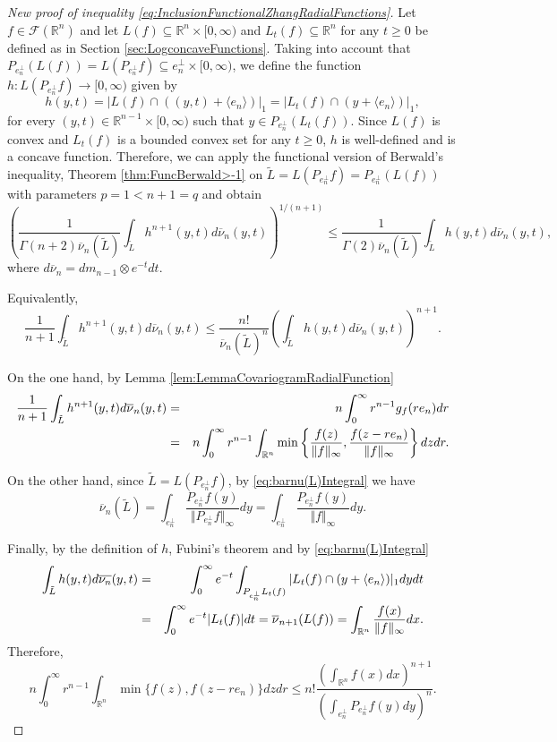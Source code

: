 \documentclass{amsart}
\newcommand{\R}{\mathbb R}
\theoremstyle{remark}
\theoremstyle{definition}
\numberwithin{equation}{section}
\begin{document}
\begin{proof}[New proof of inequality \eqref{eq:InclusionFunctionalZhangRadialFunctions}]
Let $f\in\mathcal{F}(\R^n)$ and let $L(f)\subseteq\R^n\times[0,\infty)$ and $L_t(f)\subseteq\R^n$ for any $t\geq0$ be defined as in Section \ref{sec:LogconcaveFunctions}. Taking into account that $P_{e_n^\perp}(L(f))=L(P_{e_n^\perp}f)\subseteq e_n^\perp\times[0,\infty)$, we define the function $h:L(P_{e_n^\perp}f)\to[0,\infty)$ given by
$$
h(y,t)=|L(f) \cap ((y,t)+\langle e_n \rangle )|_1=|L_t(f) \cap (y+\langle e_n \rangle)|_1,
$$
for every $(y,t)\in\R^{n-1}\times[0,\infty)$ such that $y\in P_{e_n^\perp}(L_t(f))$. Since $L(f)$ is convex and $L_t(f)$ is a bounded convex set for any $t\geq0$, $h$ is well-defined and is a concave function. Therefore, we can apply the functional version of Berwald's inequality, Theorem \ref{thm:FuncBerwald>-1} on $\tilde{L}=L(P_{e_n^\perp}f)=P_{e_n^\perp}(L(f))$ with parameters $p=1<n+1=q$ and obtain
$$
	\left(\frac{1}{\Gamma(n+2)\overline{\nu}_n(\tilde{L})}\int_{\tilde{L}} h^{n+1}(y,t)d\overline{\nu}_n(y,t)\right)^{1/(n+1)}\leq\frac{1}{\Gamma(2)\overline{\nu}_n(\tilde{L})}\int_{\tilde{L}} h(y,t)d\overline{\nu}_n(y,t),
$$
where $d\overline{\nu}_n=dm_{n-1}\otimes e^{-t}dt$.


Equivalently,
$$
\frac{1}{n+1}\int_{\tilde{L}} h^{n+1}(y,t)d\overline{\nu}_n(y,t)\leq \frac{n!}{\overline{\nu}_n(\tilde{L})^n}\left(\int_{\tilde{L}} h(y,t)d\overline{\nu}_n(y,t)\right)^{n+1}.
$$

On the one hand, by Lemma \ref{lem:LemmaCovariogramRadialFunction}
\begin{eqnarray*}
\frac{1}{n+1}\int_{\tilde{L}} h^{n+1}(y,t)d\overline{\nu}_n(y,t)&=&n\int_0^\infty r^{n-1}g_f(re_n)dr\cr
&=&n\int_0^\infty r^{n-1}\int_{\R^n}\min\left\{\frac{f(z)}{\Vert f\Vert_\infty},\frac{f(z-re_n)}{\Vert f\Vert_\infty}\right\}dzdr.
\end{eqnarray*}

On the other hand, since $\tilde{L}=L(P_{e_n^\perp}f)$, by \eqref{eq:barnu(L)Integral} we have
$$
\overline{\nu}_n(\tilde{L})=\int_{e_n^\perp}\frac{P_{e_n^\perp}f (y)}{\Vert P_{e_n^\perp}f\Vert_\infty}dy=\int_{e_n^\perp}\frac{P_{e_n^\perp}f (y)}{\Vert f\Vert_\infty}dy.
$$

Finally, by the definition of $h$,  Fubini's theorem and by \eqref{eq:barnu(L)Integral}
\begin{eqnarray*}
\int_{\tilde{L}} h(y,t)d\overline{\nu_n}(y,t)&=&\int_{0}^\infty e^{-t}\int_{P_{e_n^\perp}L_t(f)}|L_t(f) \cap (y+\langle e_n \rangle )|_1dydt\cr
&=&\int_{0}^\infty e^{-t}|L_t(f)|dt=\overline{\nu}_{n+1}(L(f))=\int_{\R^n}\frac{f(x)}{\Vert f\Vert_\infty}dx.
\end{eqnarray*}
Therefore,
$$
n\int_0^\infty r^{n-1}\int_{\R^n}\min\{f(z),f(z-re_n)\}dzdr\leq n!\frac{\left(\int_{\R^n}f(x)dx\right)^{n+1}}{\left(\int_{e_n^\perp}P_{e_n^\perp}f(y)dy\right)^n}.
$$
\end{proof}
\end{document}
